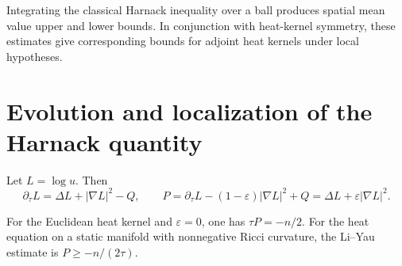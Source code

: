 \begin{remark}
\label{rem:chow-iii-harnack-mean-value-adjoint-kernels}

Integrating the classical Harnack inequality over a ball produces spatial
mean value upper and lower bounds.  In conjunction with heat-kernel symmetry,
these estimates give corresponding bounds for adjoint heat kernels under
local hypotheses.
\end{remark}

\section{Evolution and localization of the Harnack quantity}

Let \(L=\log u\).  Then
\[
 \partial_\tau L=\Delta L+|\nabla L|^2-Q,
 \qquad P=\partial_\tau L-(1-\varepsilon)|\nabla L|^2+Q
 =\Delta L+\varepsilon|\nabla L|^2.
\]

\begin{remark}
\label{rem:chow-iii-model-harnack-quantity}

For the Euclidean heat kernel and \(\varepsilon=0\), one has
\(\tau P=-n/2\).  For the heat equation on a static manifold with
nonnegative Ricci curvature, the Li--Yau estimate is \(P\geq-n/(2\tau)\).
\end{remark}


